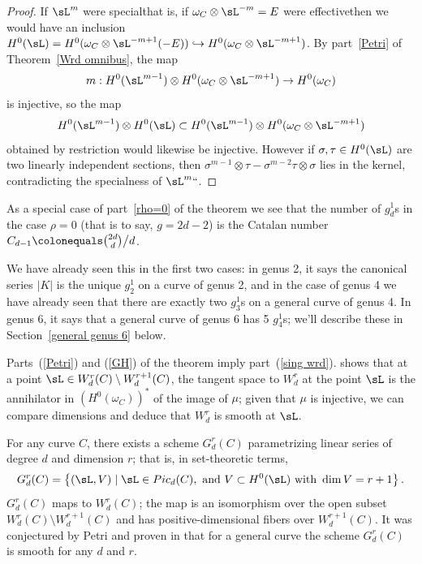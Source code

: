 \begin{proof}
If $\sL^m$ were special\emdash that is, if $\omega_C\otimes \sL^{-m}
= E$ were effective\emdash then we would have an inclusion $H^0(\sL) =
H^0(\omega_C\otimes \sL^{-m+1}(-E)) \hookrightarrow H^0(\omega_C\otimes
\sL^{-m+1})$. By part~\ref{Petri} of Theorem~\ref{Wrd omnibus}, the map
 $$
m : H^0(\sL^{m-1}) \otimes H^0(\omega_C\otimes \sL^{-m+1}) \to
H^0(\omega_C)
$$
is injective, so the map
$$
H^0(\sL^{m-1}) \otimes H^0(\sL) \subset H^0(\sL^{m-1}) \otimes
H^0(\omega_C\otimes \sL^{-m+1})
$$
obtained by restriction would likewise be injective.
However if $\sigma, \tau \in H^0(\sL)$ are two linearly independent
sections, then $\sigma^{m-1} \otimes \tau - \sigma^{m-2}\tau \otimes
\sigma$ lies in the kernel, contradicting the specialness of $\sL^m` `$.
\end{proof}
\begin{remark}
 As a special case of part~\ref{rho=0} of the theorem we see that
 the number of $g^{1}_{d}$s
 in the case $\rho=0$
(that is to say,
$g=2d-2$) is the
Catalan number
%
 $C_{d-1}\colonequals  \tbinom{2d}{d}\big/ d$.

We have already seen this in the first two cases: in genus 2, it says
the canonical series $|K|$ is the unique $g^1_2$ on a curve of genus 2,
and in the case of genus 4 we have already seen  that there are exactly
two $g^1_3$s on a general curve of genus 4. In genus 6, it says that
a general curve of genus 6 has 5 $g^1_4$s; we'll describe these in
Section~\ref{general genus 6} below.
\end{remark}

\begin{remark}
Parts~(\ref{Petri}) and (\ref{GH}) of the theorem imply part~(\ref{sing wrd}).
\cite[Section IV.4]{ACGH} shows that at a point $\sL  \in W^r_d(C)
\setminus W^{r+1}_d(C)$, the tangent space to $W^r_d$ at the point $\sL $
is the annihilator
in $(H^0(\omega_C))^*$ of the image of $\mu$; given that $\mu$ is
injective, we can compare dimensions and deduce that $W^r_d$ is smooth
at $\sL $.
\end{remark}

\begin{remark}
For any curve $C$, there exists a scheme $G^r_d(C)$ parametrizing
linear series of degree $d$ and dimension $r$; that is, in set-theoretic
terms,
$$
G^r_d(C) = \left\{ (\sL , V) \mid \sL  \in Pic_d(C), \text{ and }
V \subset H^0(\sL ) \text{ with } \dim V = r+1 \right\}.
$$
$G^r_d(C)$ maps to $W^r_d(C)$; the map is an isomorphism over the open
subset $W^r_d(C) \setminus W^{r+1}_d(C)$ and has positive-dimensional
fibers over $W^{r+1}_d(C)$. It was conjectured
by Petri and proven in \cite{Gieseker-Petri} that for a general curve
the scheme $G^r_d(C)$ is smooth for any $d$ and $r$.
\end{remark}



